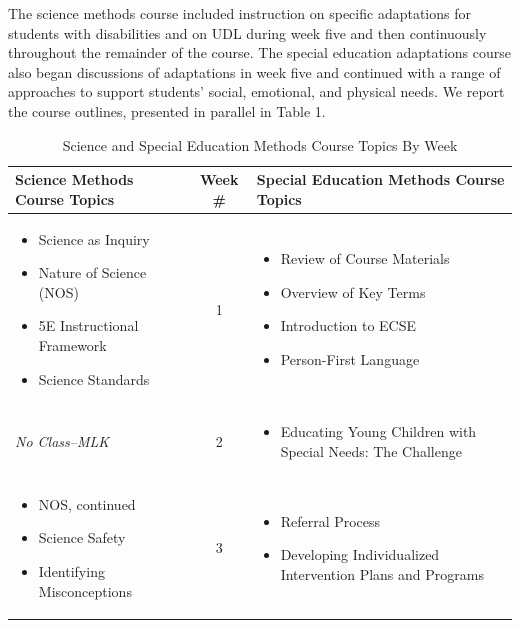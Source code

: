 \documentclass[11.5pt]{sig-alternate} %
\begin{document}
\begin{large}
The science methods course included instruction on specific adaptations for students with disabilities and on UDL during week five and then continuously throughout the remainder of the course.  The special education adaptations course also began discussions of adaptations in week five and continued with a range of approaches to support students’ social, emotional, and physical needs.  We report the course outlines, presented in parallel in Table 1.  

\begin{table}[htbp]
\caption{Science and Special Education Methods Course Topics By Week}
\begin{tabular}{|l|c|l|}
\hline
\textbf{Science Methods Course Topics} & \textbf{Week \#} & \textbf{Special Education Methods Course Topics} \\ \hline
\begin{itemize}[noitemsep, topsep=0pt]
    \item Science as Inquiry
    \item Nature of Science (NOS)
    \item 5E Instructional Framework
    \item Science Standards
\end{itemize} & 1 & \begin{itemize}[noitemsep, topsep=0pt]
    \item Review of Course Materials
    \item Overview of Key Terms
    \item Introduction to ECSE
    \item Person-First Language
\end{itemize} \\ \hline
\textit{No Class--MLK} & 2 & \begin{itemize}[noitemsep, topsep=0pt]
    \item Educating Young Children with Special Needs: The Challenge
\end{itemize} \\ \hline
\begin{itemize}[noitemsep, topsep=0pt]
    \item NOS, continued
    \item Science Safety
    \item Identifying Misconceptions
\end{itemize} & 3 & \begin{itemize}[noitemsep, topsep=0pt]
    \item Referral Process
    \item Developing Individualized Intervention Plans and Programs

\end{itemize}
\end{tabular}
\end{table}
\end{large}
\end{document}
